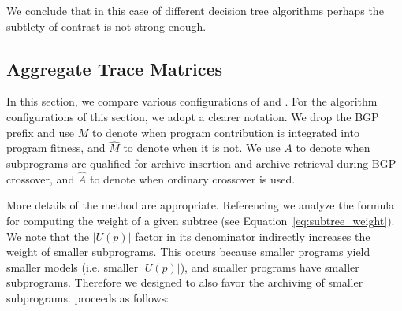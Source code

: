 %
%
%
%
%
%
We conclude that in this case of different decision tree algorithms perhaps the subtlety of contrast is not strong enough.  

\subsection{Aggregate Trace Matrices}\label{sect:agg-features}
In this section, we compare various configurations of \FULL and \DRAW.  For the algorithm configurations of this section, we adopt a clearer notation. We drop the BGP prefix and use $M$ to denote when program contribution is integrated into program fitness, and $\hat M$ to denote when it is not. We use $A$ to denote when subprograms are qualified for archive insertion and archive retrieval during BGP crossover, and $\hat A$ to denote when ordinary crossover is used.

More details of the \DRAW method are appropriate.  Referencing \cite{krawiecGecco2014} we analyze the formula for computing the weight of a given subtree (see Equation~\ref{eq:subtree_weight}).  We note that the $|U(p)|$ factor in its denominator indirectly increases the weight of smaller subprograms.  This occurs because smaller programs yield smaller models (i.e. smaller $|U(p)|$), and smaller programs have smaller subprograms.  Therefore we designed \DRAW to also favor the archiving of smaller subprograms.  \DRAW proceeds as follows:


